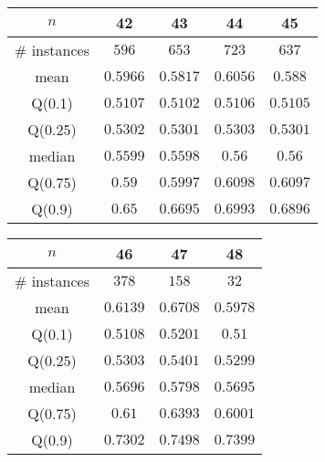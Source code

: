 \begin{tabular}{c|cccc} 
\hline 
$n$ & 42 & 43 & 44 & 45 \tabularnewline 
\hline 
\hline 
\# instances & $596$ & $653$ & $723$ & $637$ \tabularnewline 
mean & $0.5966$ & $0.5817$ & $0.6056$ & $0.588$ \tabularnewline 
Q(0.1) & $0.5107$ & $0.5102$ & $0.5106$ & $0.5105$ \tabularnewline 
Q(0.25) & $0.5302$ & $0.5301$ & $0.5303$ & $0.5301$ \tabularnewline 
median & $0.5599$ & $0.5598$ & $0.56$ & $0.56$ \tabularnewline 
Q(0.75) & $0.59$ & $0.5997$ & $0.6098$ & $0.6097$ \tabularnewline 
Q(0.9) & $0.65$ & $0.6695$ & $0.6993$ & $0.6896$ \tabularnewline 
\hline 
\end{tabular} 
\medskip{} 

\begin{tabular}{c|ccc} 
\hline 
$n$ & 46 & 47 & 48 \tabularnewline 
\hline 
\hline 
\# instances & $378$ & $158$ & $32$ \tabularnewline 
mean & $0.6139$ & $0.6708$ & $0.5978$ \tabularnewline 
Q(0.1) & $0.5108$ & $0.5201$ & $0.51$ \tabularnewline 
Q(0.25) & $0.5303$ & $0.5401$ & $0.5299$ \tabularnewline 
median & $0.5696$ & $0.5798$ & $0.5695$ \tabularnewline 
Q(0.75) & $0.61$ & $0.6393$ & $0.6001$ \tabularnewline 
Q(0.9) & $0.7302$ & $0.7498$ & $0.7399$ \tabularnewline 
\hline 
\end{tabular} 
\medskip{} 

